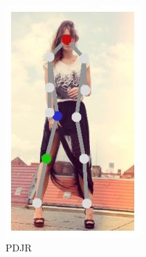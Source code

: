 \begin{figure}[h]
\centering
\begin{subfigure}[b]{.16\textwidth}
	\centering
	\includegraphics[width=\textwidth]{./images/regpose_topology.png}
	\caption{PDJR \cite{PDJR}}
\end{subfigure}
\begin{subfigure}[b]{.3\textwidth}
	\centering

\end{subfigure}
\end{figure}
